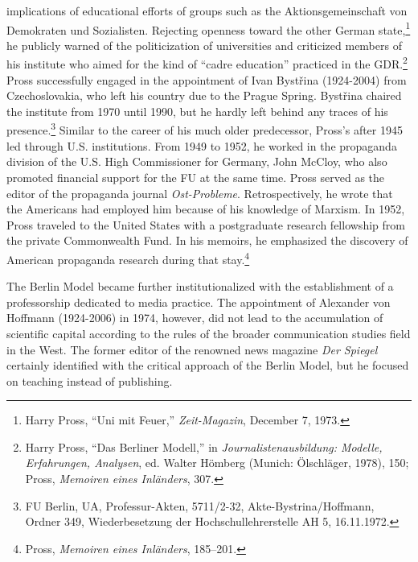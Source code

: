 \documentclass{tufte-handout}
\begin{document}
implications of educational efforts of groups such as the
Aktionsgemeinschaft von Demokraten und Sozialisten. Rejecting openness
toward the other German state,\footnote{Harry Pross, ``Uni mit Feuer,''
  \emph{Zeit-Magazin}, December 7, 1973.} he publicly warned of the
politicization of universities and criticized members of his institute
who aimed for the kind of ``cadre education'' practiced in the
GDR.\footnote{Harry Pross, ``Das Berliner Modell,'' in
  \emph{Journalistenausbildung: Modelle, Erfahrungen, Analysen}, ed.
  Walter Hömberg (Munich: Ölschläger, 1978), 150; Pross, \emph{Memoiren
  eines Inländers}, 307.} Pross successfully engaged in the appointment
of Ivan Bystřina (1924-2004) from Czechoslovakia, who left his country
due to the Prague Spring. Bystřina chaired the institute from 1970 until
1990, but he hardly left behind any traces of his presence.\footnote{FU
  Berlin, UA, Professur-Akten, 5711/2-32, Akte-Bystrina/Hoffmann, Ordner
  349, Wiederbesetzung der Hochschullehrerstelle AH 5, 16.11.1972.}
Similar to the career of his much older predecessor, Pross's after 1945
led through U.S. institutions. From 1949 to 1952, he worked in the
propaganda division of the U.S. High Commissioner for Germany, John
McCloy, who also promoted financial support for the FU at the same time.
Pross served as the editor of the propaganda journal
\emph{Ost-Probleme}. Retrospectively, he wrote that the Americans had
employed him because of his knowledge of Marxism. In 1952, Pross
traveled to the United States with a postgraduate research fellowship
from the private Commonwealth Fund. In his memoirs, he emphasized the
discovery of American propaganda research during that stay.\footnote{Pross,
  \emph{Memoiren eines Inländers}, 185--201.}

The Berlin Model became further institutionalized with the establishment
of a professorship dedicated to media practice. The appointment of
Alexander von Hoffmann (1924-2006) in 1974, however, did not lead to the
accumulation of scientific capital according to the rules of the broader
communication studies field in the West. The former editor of the
renowned news magazine \emph{Der Spiegel} certainly identified with the
critical approach of the Berlin Model, but he focused on teaching
instead of publishing.
\end{document}
